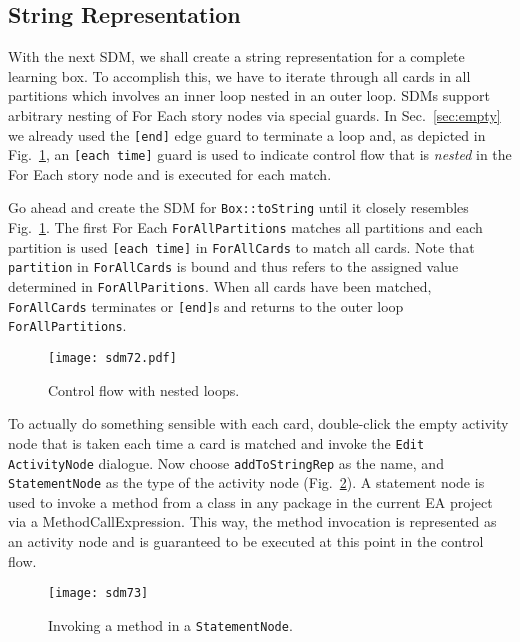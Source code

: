 \newpage
\subsection{String Representation}

With the next SDM, we shall create a string representation for a complete learning box. To accomplish this, we have to iterate through all cards in all
partitions which involves an inner loop nested in an outer loop. SDMs support arbitrary nesting of For Each story nodes via special guards. In
Sec.~\ref{sec:empty} we already used the \texttt{[end]} edge guard to terminate a loop and, as depicted in Fig.~\ref{fig:sdm_tostring_1}, an
\texttt{[each time]} guard is used to indicate control flow that is \emph{nested} in the For Each story node and is executed for each match.

Go ahead and create the SDM for \texttt{Box::toString} until it closely resembles Fig.~\ref{fig:sdm_tostring_1}. The first For Each \texttt{ForAllPartitions}
matches all partitions and each partition is used \texttt{[each time]} in \texttt{ForAllCards} to match all cards. Note that \texttt{partition} in
\texttt{ForAllCards} is bound  and thus refers to the assigned value determined in \texttt{ForAllParitions}. When all cards have been matched,
\texttt{ForAllCards} terminates or \texttt{[end]}s and returns to the outer loop \texttt{ForAllPartitions}.

\begin{figure}[htbp]
\begin{center}
  \texttt{[image: sdm72.pdf]}
  \caption{Control flow with nested loops.}  
  \label{fig:sdm_tostring_1}
\end{center}
\end{figure}

To actually do something sensible with each card, double-click the empty activity node that is taken each time a card is matched and invoke the \texttt{Edit
ActivityNode} dialogue. Now choose \texttt{addToStringRep} as the name, and \texttt{StatementNode} as the type of the activity node
(Fig.~\ref{fig:sdm_tostring_2}).  A statement node is used to invoke a method from a class in any package in the current EA project via a
MethodCallExpression. This way, the method invocation is represented as an activity node and is guaranteed to be executed at this point in the control flow.

\begin{figure}[htbp]
\begin{center}
  \texttt{[image: sdm73]}
  \caption{Invoking a method in a \texttt{StatementNode}.}  
  \label{fig:sdm_tostring_2}
\end{center}
\end{figure}

